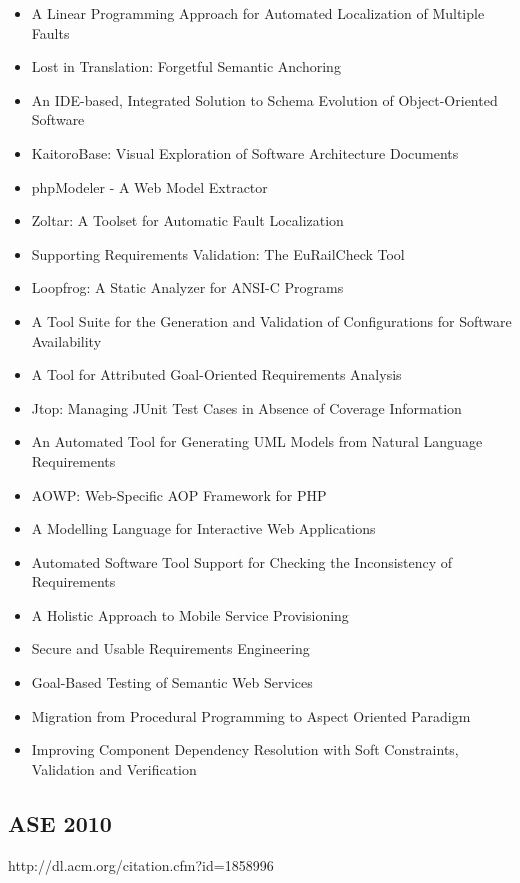 {\begin{itemize}[itemsep=-1ex]
  \item A Linear Programming Approach for Automated Localization of Multiple Faults
  \item Lost in Translation: Forgetful Semantic Anchoring
  \item An IDE-based, Integrated Solution to Schema Evolution of Object-Oriented Software
  \item KaitoroBase: Visual Exploration of Software Architecture Documents
  \item phpModeler - A Web Model Extractor
  \item Zoltar: A Toolset for Automatic Fault Localization
  \item Supporting Requirements Validation: The EuRailCheck Tool
  \item Loopfrog: A Static Analyzer for ANSI-C Programs
  \item A Tool Suite for the Generation and Validation of Configurations for Software Availability
  \item A Tool for Attributed Goal-Oriented Requirements Analysis
  \item Jtop: Managing JUnit Test Cases in Absence of Coverage Information
  \item An Automated Tool for Generating UML Models from Natural Language Requirements
  \item AOWP: Web-Specific AOP Framework for PHP
  \item A Modelling Language for Interactive Web Applications
  \item Automated Software Tool Support for Checking the Inconsistency of Requirements
  \item A Holistic Approach to Mobile Service Provisioning
  \item Secure and Usable Requirements Engineering
  \item Goal-Based Testing of Semantic Web Services
  \item Migration from Procedural Programming to Aspect Oriented Paradigm
  \item Improving Component Dependency Resolution with Soft Constraints, Validation and Verification
\end{itemize}
}

\subsection{ASE 2010}

http://dl.acm.org/citation.cfm?id=1858996


